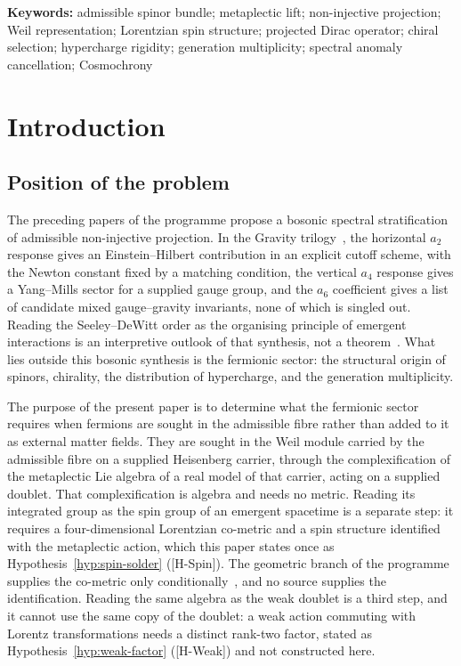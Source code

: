 \documentclass[11pt,a4paper]{article}
\theoremstyle{definition}
\theoremstyle{remark}
\begin{document}
  \medskip
  \noindent\textbf{Keywords:}
  admissible spinor bundle;
  metaplectic lift;
  non-injective projection;
  Weil representation;
  Lorentzian spin structure;
  projected Dirac operator;
  chiral selection;
  hypercharge rigidity;
  generation multiplicity;
  spectral anomaly cancellation;
  Cosmochrony

  \newpage
  \tableofcontents

  \newpage
  \section{Introduction}
    \label{sec:introduction}

    \subsection{Position of the problem}
      \label{ssec:position}

      The preceding papers of the programme propose a bosonic spectral stratification
      of admissible non-injective projection.
      In the Gravity trilogy~\cite{Beau2026h,Beau2026q12,Beau2026q13}, the horizontal $a_2$
      response gives an Einstein--Hilbert contribution in an explicit cutoff scheme, with the Newton
      constant fixed by a matching condition, the vertical $a_4$ response gives a Yang--Mills sector
      for a supplied gauge group, and the $a_6$ coefficient gives a list of candidate mixed
      gauge--gravity invariants, none of which is singled out.
      Reading the Seeley--DeWitt order as the organising principle of emergent interactions is an
      interpretive outlook of that synthesis, not a theorem~\cite{Beau2026q13}.
      What lies outside this bosonic synthesis is the fermionic sector: the structural
      origin of spinors, chirality, the distribution of hypercharge, and the generation
      multiplicity.

      The purpose of the present paper is to determine what the fermionic sector requires when
      fermions are sought in the admissible fibre rather than added to it as external matter fields.
      They are sought in the Weil module carried by the admissible fibre on a supplied Heisenberg
      carrier, through the complexification of the metaplectic Lie algebra of a real model of that
      carrier, acting on a supplied doublet.
      That complexification is algebra and needs no metric.
      Reading its integrated group as the spin group of an emergent spacetime is a separate step: it
      requires a four-dimensional Lorentzian co-metric and a spin structure identified with the
      metaplectic action, which this paper states once as Hypothesis~\ref{hyp:spin-solder} ([H-Spin]).
      The geometric branch of the programme supplies the co-metric only
      conditionally~\cite{Beau2026q5b,BeauQ8,Beau2026q11}, and no source supplies the identification.
      Reading the same algebra as the weak doublet is a third step, and it cannot use the same copy of
      the doublet: a weak action commuting with Lorentz transformations needs a distinct rank-two
      factor, stated as Hypothesis~\ref{hyp:weak-factor} ([H-Weak]) and not constructed here.
\end{document}
